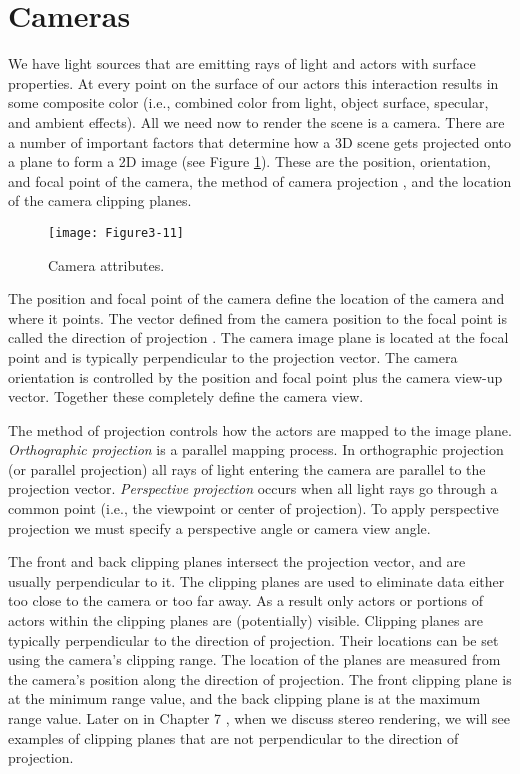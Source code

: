 \section{Cameras}

We have light sources that are emitting rays of light and actors with surface properties. At every point on the surface of our actors this interaction results in some composite color (i.e., combined color from light, object surface, specular, and ambient effects). All we need now to render the scene is a camera. There are a number of important factors that determine how a 3D scene gets projected onto a plane to form a 2D image (see Figure \ref{fig:Figure3-11}). These are the position, orientation, and focal point of the camera, the method of camera projection , and the location of the camera clipping planes.

\begin{figure}[!htb]
  \centering
  \texttt{[image: Figure3-11]}\\
  \caption{Camera attributes.}\label{fig:Figure3-11}
\end{figure}

The position and focal point of the camera define the location of the camera and where it points. The vector defined from the camera position to the focal point is called the direction of projection . The camera image plane is located at the focal point and is typically perpendicular to the projection vector. The camera orientation is controlled by the position and focal point plus the camera view-up vector. Together these completely define the camera view. 

The method of projection controls how the actors are mapped to the image plane. \emph{Orthographic projection} is a parallel mapping process. In orthographic projection (or parallel projection) all rays of light entering the camera are parallel to the projection vector. \emph{Perspective projection} occurs when all light rays go through a common point (i.e., the viewpoint or center of projection). To apply perspective projection we must specify a perspective angle or camera view angle.

The front and back clipping planes intersect the projection vector, and are usually perpendicular to it. The clipping planes are used to eliminate data either too close to the camera or too far away. As a result only actors or portions of actors within the clipping planes are (potentially) visible. Clipping planes are typically perpendicular to the direction of projection. Their locations can be set using the camera’s clipping range. The location of the planes are measured from the camera’s position along the direction of projection. The front clipping plane is at the minimum range value, and the back clipping plane is at the maximum range value. Later on in Chapter 7 , when we discuss stereo rendering, we will see examples of clipping planes that are not perpendicular to the direction of projection.

